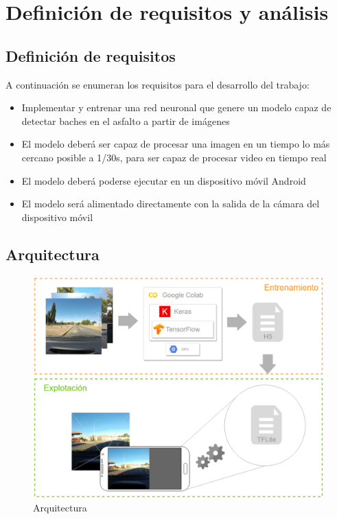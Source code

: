\section{Definición de requisitos y análisis}
\label{sec:definicion_de_requisitos_y_analisis}

\subsection{Definición de requisitos}

A continuación se enumeran los requisitos para el desarrollo del trabajo:

\begin{itemize}
	\item Implementar y entrenar una red neuronal que genere un modelo capaz de detectar baches en el asfalto a partir de imágenes
	\item El modelo deberá ser capaz de procesar una imagen en un tiempo lo más cercano posible a 1/30s, para ser capaz de procesar video en tiempo real
	\item El modelo deberá poderse ejecutar en un dispositivo móvil Android
	\item El modelo será alimentado directamente con la salida de la cámara del dispositivo móvil
\end{itemize}

\subsection{Arquitectura}

\begin{figure}[H]
	\centering
	\includegraphics[width=\linewidth]{images/architecture.png}
	\caption{Arquitectura}
	\label{fig:architecture}
\end{figure}

